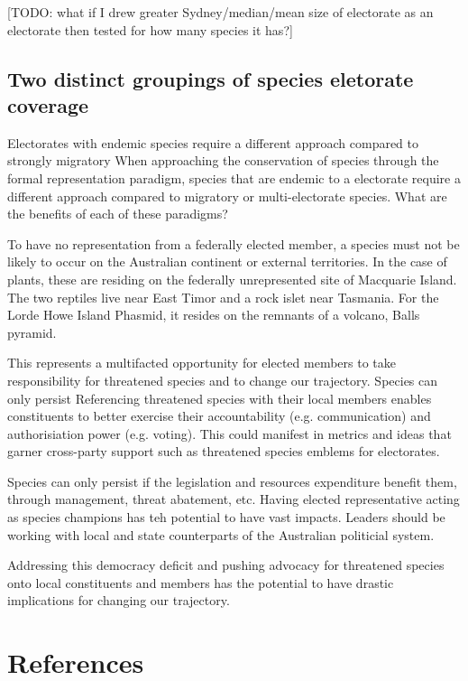 \documentclass[a4paper,11pt]{article}
\begin{document}
[TODO: what if I drew greater Sydney/median/mean size of electorate as an electorate then tested for how many species it has?]


\subsection{Two distinct groupings of species eletorate coverage}
Electorates with endemic species require a different approach compared to strongly migratory
When approaching the conservation of species through the formal representation paradigm, species that are endemic to a electorate require a different approach compared to migratory or multi-electorate species.
What are the benefits of each of these paradigms?


To have no representation from a federally elected member, a species must not be likely to occur on the Australian continent or external territories. In the case of plants, these are residing on the federally unrepresented site of Macquarie Island. The two reptiles live near East Timor and a rock islet near Tasmania. For the Lorde Howe Island Phasmid, it resides on the remnants of a volcano, Balls pyramid. 




This represents a multifacted opportunity for elected members to take responsibility for threatened species and to change our trajectory.
Species can only persist 
Referencing threatened species with their local members enables constituents to better exercise their accountability (e.g. communication) and authorisiation power (e.g. voting). This could manifest in metrics and ideas that garner cross-party support such as threatened species emblems for electorates. 

Species can only persist if the legislation and resources expenditure benefit them, through management, threat abatement, etc. Having elected representative acting as species champions has teh potential to have vast impacts.
Leaders should be working with local and state counterparts of the Australian politicial system.

Addressing this democracy deficit and pushing advocacy for threatened species onto local constituents and members has the potential to have drastic implications for changing our trajectory.

\newpage
\nolinenumbers
\section{References}
\printbibliography
\end{document}
